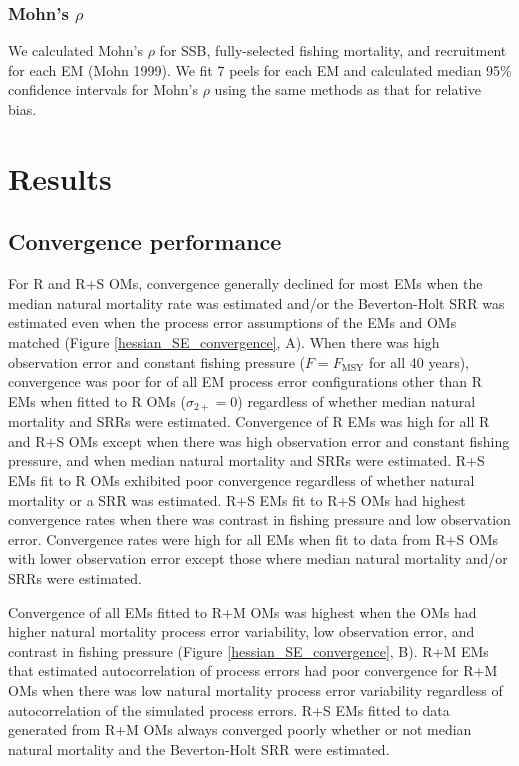 \documentclass[
  12pt,
]{article}
\begin{document}
\hypertarget{mohns-rho}{%
\subsubsection*{\texorpdfstring{Mohn's
\(\rho\)}{Mohn's \textbackslash rho}}\label{mohns-rho}}

We calculated Mohn's \(\rho\) for SSB, fully-selected fishing mortality,
and recruitment for each EM (Mohn 1999). We fit 7 peels for each EM and
calculated median 95\% confidence intervals for Mohn's \(\rho\) using
the same methods as that for relative bias.

\hypertarget{results}{%
\section*{Results}\label{results}}

\hypertarget{convergence-performance}{%
\subsection*{Convergence performance}\label{convergence-performance}}

For R and R+S OMs, convergence generally declined for most EMs when the
median natural mortality rate was estimated and/or the Beverton-Holt SRR
was estimated even when the process error assumptions of the EMs and OMs
matched (Figure \ref{hessian_SE_convergence}, A). When there was high
observation error and constant fishing pressure (\(F = F_{\text{MSY}}\)
for all 40 years), convergence was poor for of all EM process error
configurations other than R EMs when fitted to R OMs
(\(\sigma_{2+} = 0\)) regardless of whether median natural mortality and
SRRs were estimated. Convergence of R EMs was high for all R and R+S OMs
except when there was high observation error and constant fishing
pressure, and when median natural mortality and SRRs were estimated. R+S
EMs fit to R OMs exhibited poor convergence regardless of whether
natural mortality or a SRR was estimated. R+S EMs fit to R+S OMs had
highest convergence rates when there was contrast in fishing pressure
and low observation error. Convergence rates were high for all EMs when
fit to data from R+S OMs with lower observation error except those where
median natural mortality and/or SRRs were estimated.

Convergence of all EMs fitted to R+M OMs was highest when the OMs had
higher natural mortality process error variability, low observation
error, and contrast in fishing pressure (Figure
\ref{hessian_SE_convergence}, B). R+M EMs that estimated autocorrelation
of process errors had poor convergence for R+M OMs when there was low
natural mortality process error variability regardless of
autocorrelation of the simulated process errors. R+S EMs fitted to data
generated from R+M OMs always converged poorly whether or not median
natural mortality and the Beverton-Holt SRR were estimated.
\end{document}
